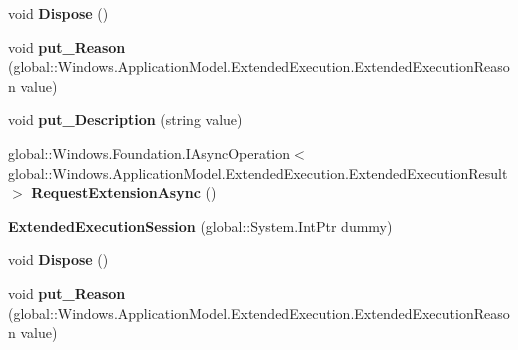 \begin{DoxyCompactItemize}
void {\bfseries Dispose} ()
\item 
\mbox{\label{class_windows_1_1_application_model_1_1_extended_execution_1_1_extended_execution_session_aa358d0b0e3c44d87b444499323cd693e}} 
void {\bfseries put\+\_\+\+Reason} (global\+::\+Windows.\+Application\+Model.\+Extended\+Execution.\+Extended\+Execution\+Reason value)
\item 
\mbox{\label{class_windows_1_1_application_model_1_1_extended_execution_1_1_extended_execution_session_af499c01b24316417ab837241cbc579f3}} 
void {\bfseries put\+\_\+\+Description} (string value)
\item 
\mbox{\label{class_windows_1_1_application_model_1_1_extended_execution_1_1_extended_execution_session_adc9b60c4fdd1c687858d54fff5085a7e}} 
global\+::\+Windows.\+Foundation.\+I\+Async\+Operation$<$ global\+::\+Windows.\+Application\+Model.\+Extended\+Execution.\+Extended\+Execution\+Result $>$ {\bfseries Request\+Extension\+Async} ()
\item 
\mbox{\label{class_windows_1_1_application_model_1_1_extended_execution_1_1_extended_execution_session_a46bcb431911d1811af8851af151075c4}} 
{\bfseries Extended\+Execution\+Session} (global\+::\+System.\+Int\+Ptr dummy)
\item 
\mbox{\label{class_windows_1_1_application_model_1_1_extended_execution_1_1_extended_execution_session_a9a9b5dca28960f42d43054fca55a63f0}} 
void {\bfseries Dispose} ()
\item 
\mbox{\label{class_windows_1_1_application_model_1_1_extended_execution_1_1_extended_execution_session_aa358d0b0e3c44d87b444499323cd693e}} 
void {\bfseries put\+\_\+\+Reason} (global\+::\+Windows.\+Application\+Model.\+Extended\+Execution.\+Extended\+Execution\+Reason value)

\end{DoxyCompactItemize}
